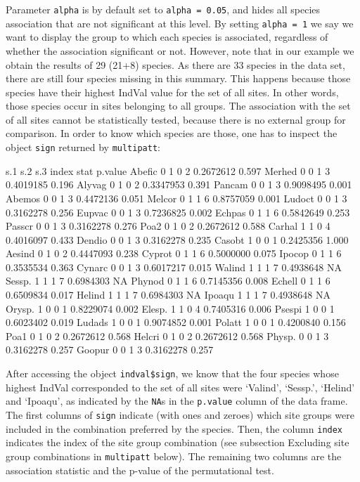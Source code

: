 \documentclass[11pt,a4paper]{article}
\begin{document}
Parameter \texttt{alpha} is by default set to \texttt{alpha = 0.05}, and hides all species association that are not significant at this level. By setting \texttt{alpha = 1} we say we want to display the group to which each species is associated, regardless of whether the association significant or not. However, note that in our example we obtain the results of 29 (21+8) species. As there are 33 species in the data set, there are still four species missing in this summary. This happens because those species have their highest IndVal value for the set of all sites. In other words, those species occur in sites belonging to all groups. The association with the set of all sites cannot be statistically tested, because there is no external group for comparison. In order to know which species are those, one has to inspect the object \texttt{sign} returned by \texttt{multipatt}:
\begin{Schunk}
\begin{Soutput}
       s.1 s.2 s.3 index      stat p.value
Abefic   0   1   0     2 0.2672612   0.597
Merhed   0   0   1     3 0.4019185   0.196
Alyvag   0   1   0     2 0.3347953   0.391
Pancam   0   0   1     3 0.9098495   0.001
Abemos   0   0   1     3 0.4472136   0.051
Melcor   0   1   1     6 0.8757059   0.001
Ludoct   0   0   1     3 0.3162278   0.256
Eupvac   0   0   1     3 0.7236825   0.002
Echpas   0   1   1     6 0.5842649   0.253
Passcr   0   0   1     3 0.3162278   0.276
Poa2     0   1   0     2 0.2672612   0.588
Carhal   1   1   0     4 0.4016097   0.433
Dendio   0   0   1     3 0.3162278   0.235
Casobt   1   0   0     1 0.2425356   1.000
Aesind   0   1   0     2 0.4447093   0.238
Cyprot   0   1   1     6 0.5000000   0.075
Ipocop   0   1   1     6 0.3535534   0.363
Cynarc   0   0   1     3 0.6017217   0.015
Walind   1   1   1     7 0.4938648      NA
Sessp.   1   1   1     7 0.6984303      NA
Phynod   0   1   1     6 0.7145356   0.008
Echell   0   1   1     6 0.6509834   0.017
Helind   1   1   1     7 0.6984303      NA
Ipoaqu   1   1   1     7 0.4938648      NA
Orysp.   1   0   0     1 0.8229074   0.002
Elesp.   1   1   0     4 0.7405316   0.006
Psespi   1   0   0     1 0.6023402   0.019
Ludads   1   0   0     1 0.9074852   0.001
Polatt   1   0   0     1 0.4200840   0.156
Poa1     0   1   0     2 0.2672612   0.568
Helcri   0   1   0     2 0.2672612   0.568
Physp.   0   0   1     3 0.3162278   0.257
Goopur   0   0   1     3 0.3162278   0.257
\end{Soutput}
\end{Schunk}
After accessing the object \texttt{indval\$sign}, we know that the four species whose highest IndVal corresponded to the set of all sites were `Valind', `Sessp.', `Helind' and `Ipoaqu', as indicated by the \texttt{NA}s in the \texttt{p.value} column of the data frame. The first columns of \texttt{sign} indicate (with ones and zeroes) which site groups were included in the combination preferred by the species. Then, the column \texttt{index} indicates the index of the site group combination (see subsection Excluding site group combinations in \texttt{multipatt} below). The remaining two columns are the association statistic and the p-value of the permutational test.
\end{document}
